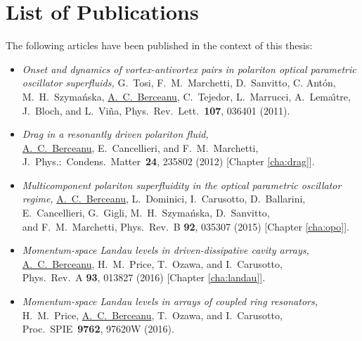 \chapter*{List of Publications}

The following articles have been published in the context of this thesis:

\begin{itemize}



\item

  \emph{Onset and dynamics of vortex-antivortex pairs in polariton optical parametric oscillator superfluids,}
  G.~Tosi, F.~M.~Marchetti, D.~Sanvitto, C. Ant\'{o}n, M.~H.~Szyma\'{n}ska, \underline{A.~C.~Berceanu}, C.~Tejedor, L.~Marrucci, A.~Lema\^{\i}tre, J.~Bloch, and L.~Vi\~{n}a,
  Phys.\ Rev.\ Lett.\ \textbf{107}, 036401 (2011).

\item

  \emph{Drag in a resonantly driven polariton fluid,}\\
  \underline{A.~C.~Berceanu}, E.~Cancellieri, and F.~M.~Marchetti,\\
  J.\ Phys.:\ Condens.\ Matter\ \textbf{24}, 235802 (2012) [Chapter \ref{cha:drag}].

\item

  \emph{Multicomponent polariton superfluidity in the optical parametric oscillator regime,}
  \underline{A.~C.~Berceanu}, L.~Dominici, I.~Carusotto, D.~Ballarini,\\
  E.~Cancellieri, G.~Gigli, M.~H.~Szyma\'{n}ska, D.~Sanvitto,\\ and F.~M.~Marchetti,
  Phys.\ Rev.\ B \textbf{92}, 035307 (2015) [Chapter \ref{cha:opo}].

\item

  \emph{Momentum-space Landau levels in driven-dissipative cavity arrays,}\\
  \underline{A.~C.~Berceanu}, H.~M.~Price, T.~Ozawa, and I.~Carusotto,\\
  Phys.\ Rev.\ A \textbf{93}, 013827 (2016) [Chapter \ref{cha:landau}].

\item

  \emph{Momentum-space Landau levels in arrays of coupled ring resonators,}\\
  H.~M.~Price, \underline{A.~C.~Berceanu}, T.~Ozawa, and I.~Carusotto,\\
  Proc.\ SPIE\ \textbf{9762}, 97620W (2016).


\end{itemize}


